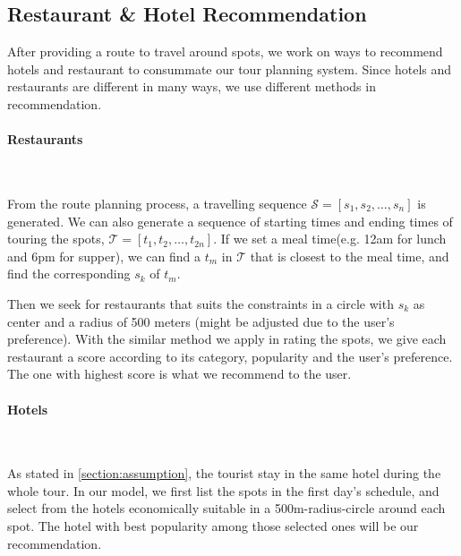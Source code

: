 \documentclass{mcmthesis}
\begin{document}
\subsection{Restaurant \& Hotel Recommendation}
  After providing a route to travel around spots, we work on ways to recommend hotels and restaurant to consummate our tour planning system. Since hotels and restaurants are different in many ways, we use different methods in recommendation.
  \paragraph{Restaurants}\
  
  From the route planning process, a travelling sequence $\mathscr{S} = [s_{1}, s_{2}, \ldots, s_{n}]$ is generated. We can also generate a sequence of starting times and ending times of touring the spots, $\mathscr{T} = [t_{1}, t_{2}, \ldots, t_{2n}]$. If we set a meal time(e.g. 12am for lunch and 6pm for supper), we can find a $t_{m}$ in $\mathscr{T}$ that is closest to the meal time, and find the corresponding $s_{k}$ of $t_{m}$. \par
  Then we seek for restaurants that suits the constraints in a circle with $s_{k}$ as center and a radius of 500 meters (might be adjusted due to the user's preference). With the similar method we apply in rating the spots, we give each restaurant a score according to its category, popularity and the user's preference. The one with highest score is what we recommend to the user.
  \paragraph{Hotels}\
  
  As stated in \ref{section:assumption}, the tourist stay in the same hotel during the whole tour. In our model, we first list the spots in the first day's schedule, and select from the hotels economically suitable in a 500m-radius-circle around each spot. The hotel with best popularity among those selected ones will be our recommendation.
\end{document}
